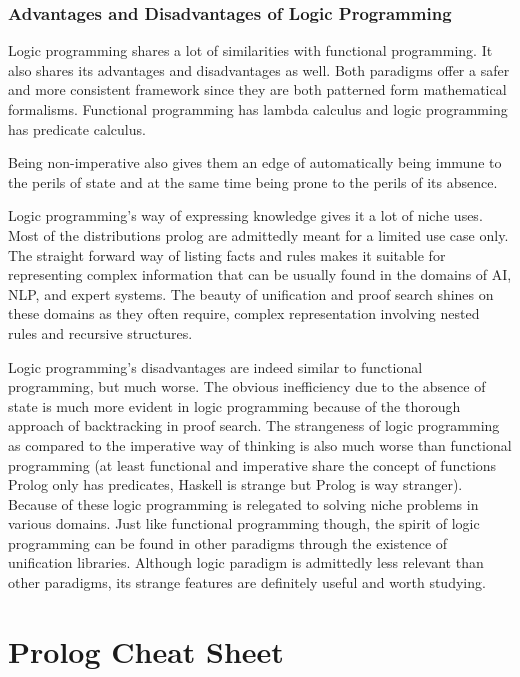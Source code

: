 \subsection{Advantages and Disadvantages of Logic
Programming}\label{logic-programming-paradigm.md__advantages-and-disadvantages-of-logic-programming}

Logic programming shares a lot of similarities with functional
programming. It also shares its advantages and disadvantages as well.
Both paradigms offer a safer and more consistent framework since they
are both patterned form mathematical formalisms. Functional programming
has lambda calculus and logic programming has predicate calculus.

Being non-imperative also gives them an edge of automatically being
immune to the perils of state and at the same time being prone to the
perils of its absence.

Logic programming's way of expressing knowledge gives it a lot of niche
uses. Most of the distributions prolog are admittedly meant for a
limited use case only. The straight forward way of listing facts and
rules makes it suitable for representing complex information that can be
usually found in the domains of AI, NLP, and expert systems. The beauty
of unification and proof search shines on these domains as they often
require, complex representation involving nested rules and recursive
structures.

Logic programming's disadvantages are indeed similar to functional
programming, but much worse. The obvious inefficiency due to the absence
of state is much more evident in logic programming because of the
thorough approach of backtracking in proof search. The strangeness of
logic programming as compared to the imperative way of thinking is also
much worse than functional programming (at least functional and
imperative share the concept of functions Prolog only has predicates,
Haskell is strange but Prolog is way stranger). Because of these logic
programming is relegated to solving niche problems in various domains.
Just like functional programming though, the spirit of logic programming
can be found in other paradigms through the existence of unification
libraries. Although logic paradigm is admittedly less relevant than
other paradigms, its strange features are definitely useful and worth
studying.

\chapter{Prolog Cheat
Sheet}\label{prolog-cheat-sheet.md__prolog-cheat-sheet}

